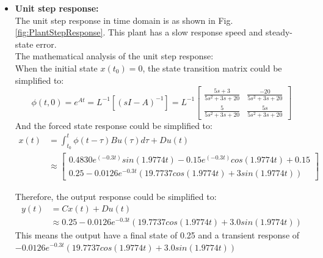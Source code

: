 \documentclass[12pt, oneside]{article}
\begin{document}
\begin{itemize}
    
    \item \textbf{Unit step response:} 
    \\The unit step response in time domain is as shown in Fig. \ref{fig:PlantStepResponse}. This plant has a slow response speed and steady-state error.
    \vspace{0.3cm}
    \\The mathematical analysis of the unit step response:
    \\When the initial state $x(t_0)=0$, the state transition matrix could be simplified to\cite{CourseMaterial}:
    \begin{equation}
        \phi(t,0)=e^{At}=L^{-1}[(sI-A)^{-1}]=L^{-1}
        \left[\begin{array}{ccc}\frac{5s+3}{5s^2+3s+20}&\frac{-20}{5s^2+3s+20}\\
        \frac{5}{5s^2+3s+20}&\frac{5s}{5s^2+3s+20}\end{array}\right]
    \end{equation}
    And the forced state response could be simplified to:
    \begin{equation}
    \begin{aligned}
        x(t)&=\int_{t_0}^t\phi(t-\tau)Bu(\tau)d\tau+Du(t)\\
        & \approx
        \left[
        \begin{array}{cc}
        0.4830e^{(-0.3t)}sin(1.9774t)-0.15e^{(-0.3t)}cos(1.9774t)+0.15  \\
             0.25-0.0126e^{-0.3t}(19.7737cos(1.9774t)+3sin(1.9774t)) 
        \end{array}
        \right]
    \end{aligned}
    \end{equation}

    Therefore, the output response could be simplified to:
    \begin{equation}
    \begin{aligned}
        y(t)&=Cx(t)+Du(t)\\
        & \approx
        0.25 - 0.0126e^{-0.3t}(19.7737cos(1.9774t) + 3.0sin(1.9774t))
    \end{aligned}
    \end{equation}
    This means the output have a final state of 0.25 and a transient response of $- 0.0126e^{-0.3t}(19.7737cos(1.9774t) + 3.0sin(1.9774t))$
    



\end{itemize}
\end{document}
